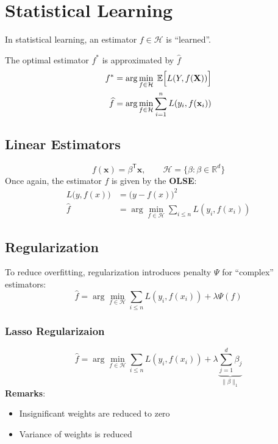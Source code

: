 \section{Statistical Learning}
In statistical learning, an estimator $f\in \mathcal{H}$ is ``learned''.

The optimal estimator $f^*$ is approximated by $\widehat{f}$
\noindent\begin{align*}
    f^*         & = \arg\min_{f\in \mathcal{H}}\; \mathbb{E}\Bigl[L(Y,f(\mathbf{X}))\Bigr] \\
    \widehat{f} & = \arg\min_{f\in \mathcal{H}} \sum_{i=1}^{n}L(y_i,f(\mathbf{x}_i))
\end{align*}

\subsection{Linear Estimators}
\noindent\begin{equation*}
    f(\mathbf{x}) = \beta^{\mathsf{T}}\mathbf{x}, \qquad \mathcal{H} = \{\beta: \beta\in \mathbb{R}^d\}
\end{equation*}
Once again, the estimator $f$ is given by the \textbf{OLSE}:
\noindent\begin{align*}
    L\big(y,f(x)\big) & ={\big(y-f(x)\big)}^{2}                                      \\
    \widehat{f}           & =\arg\min_{f\in\mathcal{H}}\sum_{i\leq n}L(y_{i},f(x_{i}))
\end{align*}

\subsection{Regularization}\label{ssec:regularization}
To reduce overfitting, regularization introduces penalty $\Psi$ for ``complex'' estimators:
\noindent\begin{equation*}
    \widehat{f} =\arg\min_{f\in\mathcal{H}}\sum_{i\leq n}L(y_{i},f(x_{i})) + \lambda\Psi(f)
\end{equation*}
\subsubsection{Lasso Regularizaion}
\noindent\begin{equation*}
    \widehat{f} =\arg\min_{f\in\mathcal{H}}\sum_{i\leq n}L(y_{i},f(x_{i})) + \lambda \underbrace{\sum_{j=1}^{d} \beta_j}_{\|\beta\|_1}
\end{equation*}
\textbf{Remarks}:
\begin{itemize}
    \item Insignificant weights are reduced to zero
    \item Variance of weights is reduced
\end{itemize}

